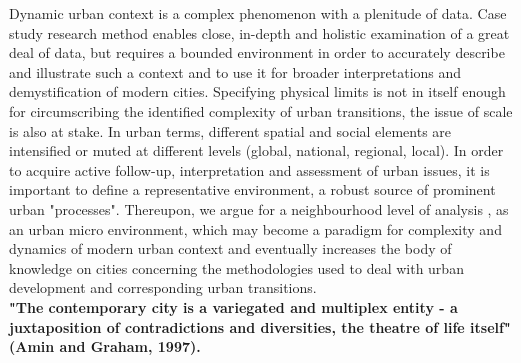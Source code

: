 \documentclass[11pt]{report}
\begin{document}
Dynamic urban context is a complex phenomenon with a plenitude of data. Case study research method enables close, in-depth and holistic examination of a great deal of data, but requires a bounded environment in order to accurately describe and illustrate such a context and to use it for broader interpretations and demystification of modern cities. Specifying physical limits is not in itself enough for circumscribing the identified complexity of urban transitions, the issue of scale is also at stake. In urban terms, different spatial and social elements are intensified or muted at different levels (global, national, regional, local). In order to acquire active follow-up, interpretation and assessment of urban issues, it is important to define a representative environment, a robust source of prominent urban "processes". Thereupon, we argue for a neighbourhood level of analysis , as an urban micro environment, which may become a paradigm for complexity and dynamics of modern urban context and eventually increases the body of knowledge on cities concerning the methodologies used to deal with urban development and corresponding urban transitions.
\\
\textbf{"The contemporary city is a variegated and multiplex entity - a juxtaposition of contradictions and diversities, the theatre of life itself" (Amin and Graham, 1997).}
\end{document}

